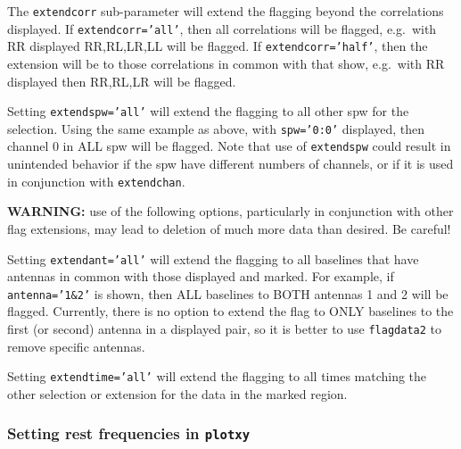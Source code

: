 The {\tt extendcorr} sub-parameter will extend the flagging beyond the
correlations displayed.  If {\tt extendcorr='all'}, then all
correlations will be flagged, e.g.\ with RR displayed RR,RL,LR,LL will 
be flagged.  If {\tt extendcorr='half'}, then the extension will be
to those correlations in common with that show, e.g.\ with RR
displayed then RR,RL,LR will be flagged.

Setting {\tt extendspw='all'} will extend the flagging to all other
spw for the selection.  Using the same example as above, with
{\tt spw='0:0'} displayed, then channel 0 in ALL spw will be flagged.
Note that use of {\tt extendspw} could result in unintended behavior
if the spw have different numbers of channels, or if it is used in
conjunction with {\tt extendchan}.

{\bf WARNING:} use of the following options, particularly in
conjunction with other flag extensions, may lead to deletion of much
more data than desired.  Be careful!

Setting {\tt extendant='all'} will extend the flagging to all
baselines that have antennas in common with those displayed and
marked.  For example, if {\tt antenna='1\&2'} is shown, then ALL
baselines to BOTH antennas 1 and 2 will be flagged.  Currently, there
is no option to extend the flag to ONLY baselines to the first (or 
second) antenna in a displayed pair, so it is better to use
{\tt flagdata2} to remove specific antennas.

Setting {\tt extendtime='all'} will extend the flagging to all times 
matching the other selection or extension for the data in the marked
region.  

\subsubsection{Setting rest frequencies in {\tt plotxy}}
\label{section:edit.plot.plotxy.restfreq}

